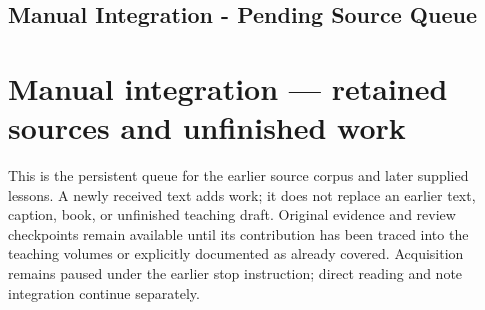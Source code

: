 \hypertarget{appendix-ac1f51db5e9a}{}
\section*{Manual Integration - Pending Source Queue}
\chapter{Manual integration --- retained sources and unfinished work}\label{appendix-ac1f51db5e9a-manual-integration-retained-sources-and-unfinished-work}

This is the persistent queue for the earlier source corpus and later supplied lessons. A newly received text adds work; it does not replace an earlier text, caption, book, or unfinished teaching draft. Original evidence and review checkpoints remain available until its contribution has been traced into the teaching volumes or explicitly documented as already covered. Acquisition remains paused under the earlier stop instruction; direct reading and note integration continue separately.

